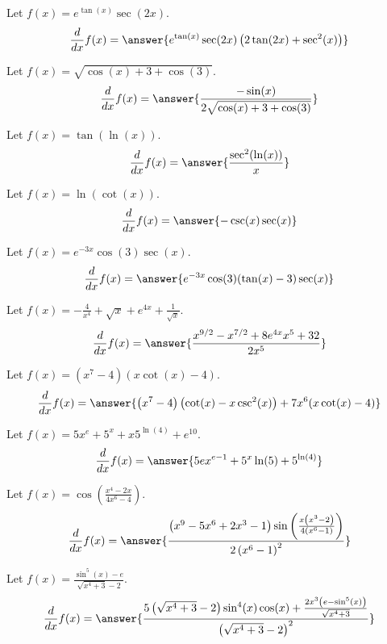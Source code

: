 \documentclass{ximera}
\begin{document}
\begin{shuffle}
\begin{exercise}
Let $f(x)=e^{\tan (x)} \sec (2 x)$.
\[
\ddx f(x) = \answer{e^{\tan (x)} \sec (2 x) \left(2 \tan (2 x)+\sec ^2(x)\right)}
\]
\end{exercise}

\begin{exercise}
Let $f(x)=\sqrt{\cos (x)+3+\cos (3)}$.
\[
\ddx f(x) = \answer{\frac{-\sin (x)}{2 \sqrt{\cos (x)+3+\cos (3)}}}
\]
\end{exercise}

\begin{exercise}
Let $f(x)=\tan (\ln (x))$.
\[
\ddx f(x) = \answer{\frac{\sec ^2(\ln (x))}{x}}
\]
\end{exercise}

\begin{exercise}
Let $f(x)=\ln (\cot (x))$.
\[
\ddx f(x) = \answer{-\csc (x) \sec (x)}
\]
\end{exercise}

\begin{exercise}
Let $f(x)=e^{-3 x} \cos (3) \sec (x)$.
\[
\ddx f(x) = \answer{e^{-3 x} \cos (3) (\tan (x)-3) \sec (x)}
\]
\end{exercise}

\begin{exercise}
Let $f(x)=-\frac{4}{x^4}+\sqrt{x}+e^{4 x}+\frac{1}{\sqrt{x}}$.
\[
\ddx f(x) = \answer{\frac{x^{9/2}-x^{7/2}+8 e^{4 x} x^5+32}{2 x^5}}
\]
\end{exercise}

\begin{exercise}
Let $f(x)=\left(x^7-4\right) (x \cot (x)-4)$.
\[
\ddx f(x) = \answer{\left(x^7-4\right) \left(\cot (x)-x \csc ^2(x)\right)+7 x^6 (x \cot (x)-4)}
\]
\end{exercise}

\begin{exercise}
Let $f(x)=5 x^e+5^x+x 5^{\ln (4)}+e^{10}$.
\[
\ddx f(x) = \answer{5 e x^{e-1}+5^x \ln (5)+5^{\ln (4)}}
\]
\end{exercise}

\begin{exercise}
Let $f(x)=\cos \left(\frac{x^4-2 x}{4 x^6-4}\right)$.
\[
\ddx f(x) = \answer{\frac{\left(x^9-5 x^6+2 x^3-1\right) \sin \left(\frac{x \left(x^3-2\right)}{4 \left(x^6-1\right)}\right)}{2 \left(x^6-1\right)^2}}
\]
\end{exercise}

\begin{exercise}
Let $f(x)=\frac{\sin ^5(x)-e}{\sqrt{x^4+3}-2}$.
\[
\ddx f(x) = \answer{\frac{5 \left(\sqrt{x^4+3}-2\right) \sin ^4(x) \cos (x)+\frac{2 x^3 \left(e-\sin ^5(x)\right)}{\sqrt{x^4+3}}}{\left(\sqrt{x^4+3}-2\right)^2}}
\]
\end{exercise}


\end{shuffle}
\end{document}
